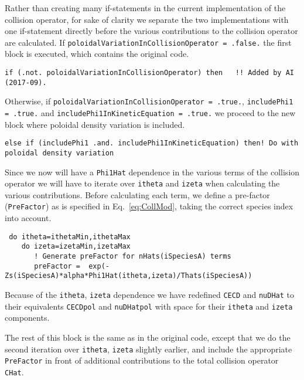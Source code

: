 \documentclass[12pt]{article}
\begin{document}
Rather than creating many if-statements in the current implementation of the collision operator, for sake of clarity we separate the two implementations with one if-statement directly before the various contributions to the collision operator are calculated. If \texttt{poloidalVariationInCollisionOperator = .false.} the first block is executed, which contains the original code. 

\begin{lstlisting}
if (.not. poloidalVariationInCollisionOperator) then   !! Added by AI (2017-09).
\end{lstlisting}

\noindent Otherwise, if \texttt{poloidalVariationInCollisionOperator = .true.}, \texttt{includePhi1 = .true.} and \texttt{includePhi1InKineticEquation = .true.} we proceed to the new block where poloidal density variation is included.

\begin{lstlisting}
else if (includePhi1 .and. includePhi1InKineticEquation) then! Do with poloidal density variation
\end{lstlisting}

\noindent
Since we now will have a \texttt{Phi1Hat} dependence in the various terms of the collision operator we will have to iterate over \texttt{itheta} and \texttt{izeta} when calculating the various contributions. Before calculating each term, we define a pre-factor (\texttt{PreFactor}) as is specified in Eq.~\eqref{eq:CollMod}, taking the correct species index into account. 

\begin{lstlisting}
 do itheta=ithetaMin,ithetaMax
    do izeta=izetaMin,izetaMax
       ! Generate preFactor for nHats(iSpeciesA) terms
       preFactor =  exp(-Zs(iSpeciesA)*alpha*Phi1Hat(itheta,izeta)/Thats(iSpeciesA))
\end{lstlisting}

\noindent
Because of the \texttt{itheta}, \texttt{izeta} dependence we have redefined \texttt{CECD} and \texttt{nuDHat} to their equivalents \texttt{CECDpol} and \texttt{nuDHatpol} with space for their \texttt{itheta} and \texttt{izeta} components. 

The rest of this block is the same as in the original code, except that we do the second iteration over \texttt{itheta}, \texttt{izeta} slightly earlier, and include the appropriate \texttt{PreFactor} in front of additional contributions to the total collision operator \texttt{CHat}. 
\end{document}
